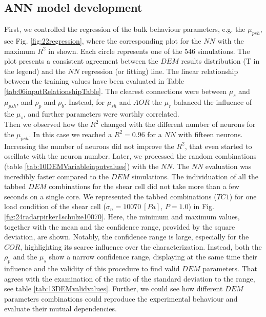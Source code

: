 \subsection{ANN model development}
\label{subsec:annmodeldev}

First, we controlled the regression of the bulk behaviour parameters, e.g. the
$\mu_{psh}$, see Fig. \ref{fig:22regression}, where the corresponding plot for
the $NN$ with the maximum $R^2$ in shown. Each circle represents one of the 546
simulations.
The plot presents a consistent agreement between the $DEM$ results distribution
(T in the legend) and the $NN$ regression (or fitting) line.
% 
The linear relationship between the
training values have been evaluated in Table \ref{tab:06inputRelationshipTable}.
The clearest connections were between $\mu_s$ and $\mu_{psh}$, and
$\rho_p$ and $\rho_b$.
Instead, for $\mu_{sh}$ and $AOR$ the $\mu_r$ balanced the influence of the 
$\mu_s$, and further parameters were worthly correlated. \\
Then we observed how the $R^2$ changed with the different number of neurons for the $\mu_{psh}$. 
In this case we reached a $R^2 = 0.96$ for a $NN$ with fifteen neurons. 
Increasing the number of neurons did not improve the $R^2$, that even started to oscillate with the neuron number. 
Later, we processed the random combinations (table
\ref{tab:10DEMVariableinputvalues}) with the $NN$.
The $NN$ evaluation was incredibly faster compared to the $DEM$ simulations. The
individuation of all the tabbed $DEM$ combinations for the shear cell did not take more than a few seconds on a single core. 
We represented the tabbed combinations ($TC1$) for one load condition of the
shear cell ($\sigma_n=10070 ~[Pa]$, $P=1.0$) in Fig.
\ref{fig:24radarpirker1schulze10070}.
% 
Here, the minimum and maximum values, together with the mean and the confidence
range, provided by the square deviation, are shown. Notably, the confidence range is large, 
especially for the $COR$, highlighting its scarce influence over the characterization. 
Instead, both the $\rho_p$  and the $\mu_s$ show a narrow confidence range, 
displaying at the same time their influence and the validity of this procedure to find valid $DEM$ parameters. 
That agrees with the examination of the ratio of the standard deviation to the
range, see table \ref{tab:13DEMvalidvalues}.
Further, we could see how different $DEM$ parameters
combinations could reproduce the experimental behaviour and evaluate their mutual dependencies. 
